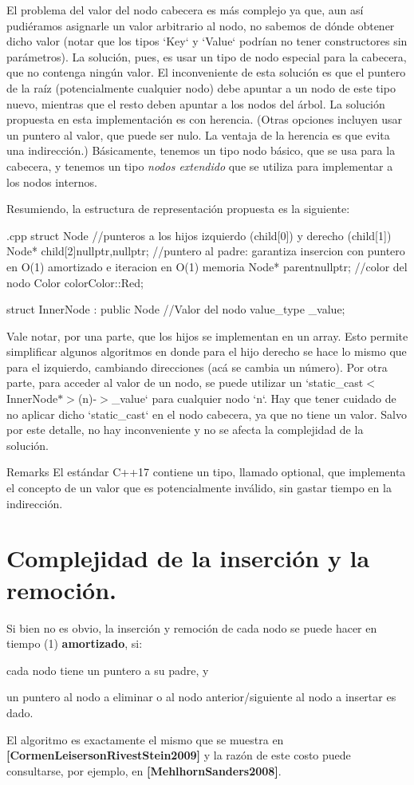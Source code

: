 \-El problema del valor del nodo cabecera es más complejo ya que, aun así pudiéramos asignarle un valor arbitrario al nodo, no sabemos de dónde obtener dicho valor (notar que los tipos `\-Key` y `\-Value` podrían no tener constructores sin parámetros). \-La solución, pues, es usar un tipo de nodo especial para la cabecera, que no contenga ningún valor. \-El inconveniente de esta solución es que el puntero de la raíz (potencialmente cualquier nodo) debe apuntar a un nodo de este tipo nuevo, mientras que el resto deben apuntar a los nodos del árbol. \-La solución propuesta en esta implementación es con herencia. (\-Otras opciones incluyen usar un puntero al valor, que puede ser nulo. \-La ventaja de la herencia es que evita una indirección.) \-Básicamente, tenemos un tipo nodo básico, que se usa para la cabecera, y tenemos un tipo {\itshape nodos extendido\/} que se utiliza para implementar a los nodos internos.

\-Resumiendo, la estructura de representación propuesta es la siguiente\-: 
\begin{DoxyCode}
 {.cpp}
 struct Node {
   //punteros a los hijos izquierdo (child[0]) y derecho (child[1])
   Node* child[2]{nullptr,nullptr};
   //puntero al padre: garantiza insercion con puntero en O(1) amortizado e
       iteracion en O(1) memoria
   Node* parent{nullptr};
   //color del nodo
   Color color{Color::Red};
 }

 struct InnerNode : public Node {
   //Valor del nodo
   value_type _value;
 }
\end{DoxyCode}
 \-Vale notar, por una parte, que los hijos se implementan en un array. \-Esto permite simplificar algunos algoritmos en donde para el hijo derecho se hace lo mismo que para el izquierdo, cambiando direcciones (acá se cambia un número). \-Por otra parte, para acceder al valor de un nodo, se puede utilizar un `static\-\_\-cast$<$\-Inner\-Node$\ast$$>$(n)-\/$>$\-\_\-value` para cualquier nodo `n`. \-Hay que tener cuidado de no aplicar dicho `static\-\_\-cast` en el nodo cabecera, ya que no tiene un valor. \-Salvo por este detalle, no hay inconveniente y no se afecta la complejidad de la solución.

\begin{DoxyRemark}{\-Remarks}
\-El estándar \-C++17 contiene un tipo, llamado optional, que implementa el concepto de un valor que es potencialmente inválido, sin gastar tiempo en la indirección.
\end{DoxyRemark}
\hypertarget{Implementacion_Inserciones}{}\section{\-Complejidad de la inserción y la remoción.}\label{Implementacion_Inserciones}
\-Si bien no es obvio, la inserción y remoción de cada nodo se puede hacer en tiempo (1) {\bfseries amortizado}, si\-:
\begin{DoxyItemize}
\item cada nodo tiene un puntero a su padre, y
\item un puntero al nodo a eliminar o al nodo anterior/siguiente al nodo a insertar es dado.
\end{DoxyItemize}

\-El algoritmo es exactamente el mismo que se muestra en {\bfseries [\-Cormen\-Leiserson\-Rivest\-Stein2009]} y la razón de este costo puede consultarse, por ejemplo, en {\bfseries [\-Mehlhorn\-Sanders2008]}. 